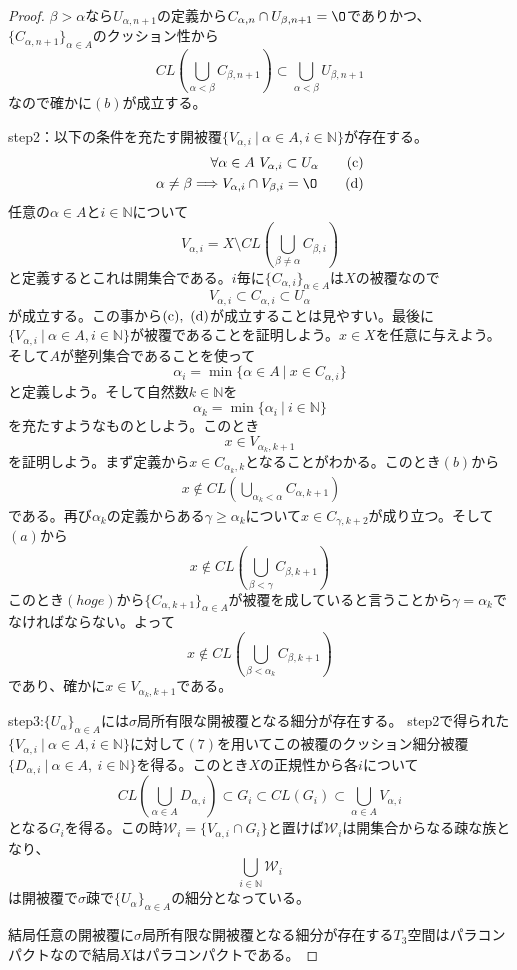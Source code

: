 \documentclass[leqno]{jsarticle}
\newcommand{\To}{\Longrightarrow}
\newcommand{\nn}{\mathbb{N}}
\newcommand{\al}{\alpha}
\newcommand{\be}{\beta}
\begin{document}
\begin{proof}
$\be>\al$なら$U_{\al,n+1}$の定義から$C_{\al,n}\cap U_{\be,n+1}=\O$でありかつ、$\{C_{\al,n+1}\}_{\al\in A}$のクッション性から
\[
CL\left(\bigcup_{\al<\be }C_{\be,n+1}\right)\subset \bigcup_{\al<\be }U_{\be,n+1}
\]
なので確かに$(b)$が成立する。
\par step2：以下の条件を充たす開被覆$\{V_{\alpha ,i}\ |\ \alpha\in A,i\in \nn\}$が存在する。
\begin{align}
\forall \al\in A\ V_{\alpha,i}\subset U_{\alpha}\tag{c}\\
\alpha \neq \beta\To V_{\alpha,i}\cap V_{\beta,i}=\O\tag{d}
\end{align}
任意の$\al\in A$と$i\in \nn$について
\[
V_{\al,i}=X\setminus CL\left(\bigcup_{\be\neq\al}C_{\be,i}\right)
\]
と定義するとこれは開集合である。$i$毎に$\{C_{\al,i}\}_{\al\in A}$は$X$の被覆なので
\[
V_{\al,i}\subset C_{\al,i}\subset U_{\al}
\]
が成立する。この事から$({\rm c}),\ ({\rm d})$が成立することは見やすい。最後に$\{V_{\alpha ,i}\ |\ \alpha\in A,i\in \nn\}$が被覆であることを証明しよう。$x\in X$を任意に与えよう。そして$A$が整列集合であることを使って
\[
\al_{i}=\min\{\al\in A\ |\ x\in C_{\al,i}\}
\]
と定義しよう。そして自然数$k\in \nn$を
\[
\al_{k}=\min\{\al_{i}\ |\ i\in \nn\}
\]
を充たすようなものとしよう。このとき
\[
x\in V_{\al_{k},k+1}
\]
を証明しよう。まず定義から$x\in C_{\al_{k},k}$となることがわかる。このとき$(b)$から
\begin{align}
\ x\not\in CL\left(\bigcup_{\al_{k}<\al}C_{\al,k+1}\right)\tag{hoge}
\end{align}
である。再び$\al_k$の定義からある$\gamma\ge \al_{k}$について$x\in C_{\gamma,k+2}$が成り立つ。そして$(a)$から
\[
x\not\in CL\left(\bigcup_{\be<\gamma}C_{\be,k+1}\right)
\]
このとき$(hoge)$から$\{C_{\al,k+1}\}_{\al\in A}$が被覆を成していると言うことから$\gamma=\al_k$でなければならない。よって
\[
x\not\in CL\left(\bigcup_{\be<\al_{k}}C_{\be,k+1}\right)
\]
であり、確かに$x\in V_{\al_k,k+1}$である。
\par step3:$\{U_{\alpha}\}_{\alpha\in A}$には$\sigma$局所有限な開被覆となる細分が存在する。
step2で得られた$\{V_{\alpha ,i}\ |\ \alpha\in A,i\in \nn\}$に対して$(7)$を用いてこの被覆のクッション細分被覆$\{D_{\al,i}\ |\ \al\in A,\ i\in\nn\}$を得る。このとき$X$の正規性から各$i$について
\[
CL\left(\bigcup_{\al\in A}D_{\al,i}\right)\subset G_i\subset CL(G_i)\subset  \bigcup_{\al\in A}V_{\al,i}
\]
となる$G_i$を得る。この時$\mathcal{W}_i=\{V_{\al,i}\cap G_i\}$と置けば$\mathcal{W}_i$は開集合からなる疎な族となり、
\[
\bigcup_{i\in \nn}\mathcal{W}_i
\]
は開被覆で$\sigma$疎で$\{U_{\al}\}_{\al\in A}$の細分となっている。
\par 結局任意の開被覆に$\sigma$局所有限な開被覆となる細分が存在する$T_3$空間はパラコンパクトなので結局$X$はパラコンパクトである。
\end{proof}
\end{document}
